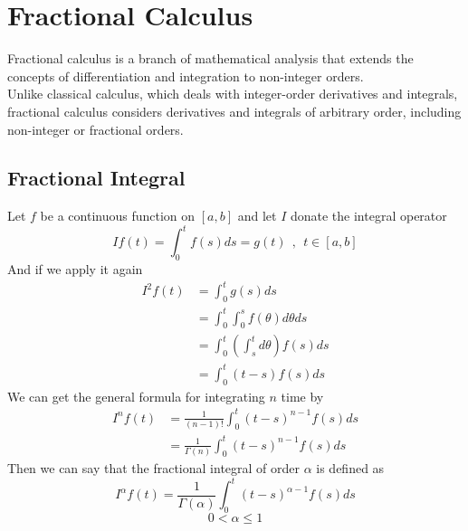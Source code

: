 \section{Fractional Calculus}
Fractional calculus is a branch of mathematical analysis that extends the concepts of
differentiation and integration to non-integer orders.
\\
Unlike classical calculus,
which deals with integer-order derivatives and integrals, fractional calculus considers
derivatives and integrals of arbitrary order, including non-integer or fractional orders.
\subsection{Fractional Integral}
Let $f$ be a continuous function on $[a,b]$ and let $I$ donate the integral operator
\[
    If(t) = \int_{0}^{t}f(s)ds = g(t) \ \ , \ \ t\in[a,b]
\]
And if we apply it again
\begin{align*}
    I^{2}f(t) & = \int_{0}^{t}g(s)ds                                  \\
              & = \int_{0}^{t}\int_{0}^{s}f(\theta)d\theta ds         \\
              & = \int_{0}^{t} \left(\int_{s}^{t}d\theta\right)f(s)ds \\
              & = \int_{0}^{t} (t-s) f(s) ds
\end{align*}
We can get the general formula for integrating $n$ time by
\begin{align*}
    I^{n}f(t) & = \frac{1}{(n-1)!}\int_{0}^{t}(t-s)^{n-1}f(s)ds   \\
              & =\frac{1}{\Gamma(n)}\int_{0}^{t}(t-s)^{n-1}f(s)ds
\end{align*}
Then we can say that the fractional integral of order $\alpha$ is defined as
\begin{equation}
    I^{\alpha}f(t) =\frac{1}{\Gamma(\alpha)}\int_{0}^{t}(t-s)^{\alpha-1}f(s)ds
\end{equation}
\[
    0<\alpha\leq 1
\]
